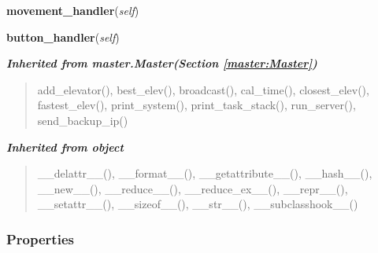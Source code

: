     \vspace{0.5ex}

\hspace{.8\funcindent}\begin{boxedminipage}{\funcwidth}

    \raggedright \textbf{movement\_handler}(\textit{self})

\setlength{\parskip}{2ex}
\setlength{\parskip}{1ex}
    \end{boxedminipage}

    \label{elev:Elev:button_handler}

    \vspace{0.5ex}

\hspace{.8\funcindent}\begin{boxedminipage}{\funcwidth}

    \raggedright \textbf{button\_handler}(\textit{self})

\setlength{\parskip}{2ex}
\setlength{\parskip}{1ex}
    \end{boxedminipage}


\large{\textbf{\textit{Inherited from master.Master\textit{(Section \ref{master:Master})}}}}

\begin{quote}
add\_elevator(), best\_elev(), broadcast(), cal\_time(), closest\_elev(), fastest\_elev(), print\_system(), print\_task\_stack(), run\_server(), send\_backup\_ip()
\end{quote}

\large{\textbf{\textit{Inherited from object}}}

\begin{quote}
\_\_delattr\_\_(), \_\_format\_\_(), \_\_getattribute\_\_(), \_\_hash\_\_(), \_\_new\_\_(), \_\_reduce\_\_(), \_\_reduce\_ex\_\_(), \_\_repr\_\_(), \_\_setattr\_\_(), \_\_sizeof\_\_(), \_\_str\_\_(), \_\_subclasshook\_\_()
\end{quote}


  \subsubsection{Properties}

